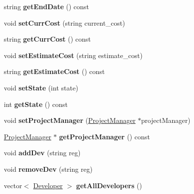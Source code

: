 \begin{DoxyCompactItemize}
\item 
string {\bfseries get\+End\+Date} () const \hypertarget{classProject_a39268ee60b428dfda5ac6e30d930a92a}{}\label{classProject_a39268ee60b428dfda5ac6e30d930a92a}

\item 
void {\bfseries set\+Curr\+Cost} (string current\+\_\+cost)\hypertarget{classProject_ac04db7be3edb6aa26e1280efdf4a2074}{}\label{classProject_ac04db7be3edb6aa26e1280efdf4a2074}

\item 
string {\bfseries get\+Curr\+Cost} () const \hypertarget{classProject_aa1ecabc71ca109ee707d45e39909e0ae}{}\label{classProject_aa1ecabc71ca109ee707d45e39909e0ae}

\item 
void {\bfseries set\+Estimate\+Cost} (string estimate\+\_\+cost)\hypertarget{classProject_a1a6c587adf48e585e0765e83f065017d}{}\label{classProject_a1a6c587adf48e585e0765e83f065017d}

\item 
string {\bfseries get\+Estimate\+Cost} () const \hypertarget{classProject_aee61373f03f817d403c9b19bbcc666d3}{}\label{classProject_aee61373f03f817d403c9b19bbcc666d3}

\item 
void {\bfseries set\+State} (int state)\hypertarget{classProject_abe8a3a0f4d4586bd3dce49279ef9aca4}{}\label{classProject_abe8a3a0f4d4586bd3dce49279ef9aca4}

\item 
int {\bfseries get\+State} () const \hypertarget{classProject_a5d9f8ffb19ba8d911993b2ae597ff6ce}{}\label{classProject_a5d9f8ffb19ba8d911993b2ae597ff6ce}

\item 
void {\bfseries set\+Project\+Manager} (\hyperlink{classProjectManager}{Project\+Manager} $\ast$project\+Manager)\hypertarget{classProject_a7ac5ed37e044c2a914ab96cbb7a12f60}{}\label{classProject_a7ac5ed37e044c2a914ab96cbb7a12f60}

\item 
\hyperlink{classProjectManager}{Project\+Manager} $\ast$ {\bfseries get\+Project\+Manager} () const \hypertarget{classProject_a290fff95edf78808be77cd0b06c69664}{}\label{classProject_a290fff95edf78808be77cd0b06c69664}

\item 
void {\bfseries add\+Dev} (string reg)\hypertarget{classProject_a739b6ad0321bca13e719c81619d779c3}{}\label{classProject_a739b6ad0321bca13e719c81619d779c3}

\item 
void {\bfseries remove\+Dev} (string reg)\hypertarget{classProject_ac803b68cdb817684356f42a6b2a5d467}{}\label{classProject_ac803b68cdb817684356f42a6b2a5d467}

\item 
vector$<$ \hyperlink{classDeveloper}{Developer} $>$ {\bfseries get\+All\+Developers} ()\hypertarget{classProject_a7f4090939ce45e1c5599913822457126}{}\label{classProject_a7f4090939ce45e1c5599913822457126}

\end{DoxyCompactItemize}
